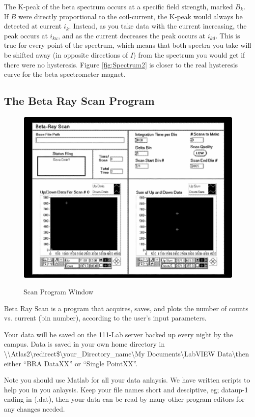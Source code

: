 \documentclass{../lab}
\begin{document}
The K-peak of the beta spectrum occurs at a specific field strength, marked $B_k$. If $B$ were directly proportional to the coil-current, the K-peak would always be detected at current $i_k$. Instead, as you take data with the current increasing, the peak occurs at $i_{ku}$, and as the current decreases the peak occurs at $i_{kd}$. This is true for every point of the spectrum, which means that both spectra you take will be shifted away (in opposite directions of $I$) from the spectrum you would get if there were no hysteresis. Figure \ref{fig:Spectrum2} is closer to the real hysteresis curve for the beta spectrometer magnet.

\pagebreak

\subsection{The Beta Ray Scan Program}

\begin{figure}[h]
    \centering
    \href{http://experimentationlab.berkeley.edu/sites/default/files/images/470px-BRAimage030.gif}{\includegraphics[width=0.5\linewidth]{images/470px-BRAimage030.png}}
    \caption{Scan Program Window}
\end{figure}

Beta Ray Scan is a program that acquires, saves, and plots the number of counts vs. current (bin number), according to the user's input parameters.

Your data will be saved on the 111-Lab server backed up every night by the campus. Data is saved in your own home directory in \textbackslash \textbackslash Atlas2\textbackslash redirect\$\textbackslash your\_Directory\_name\textbackslash My Documents\textbackslash LabVIEW Data\textbackslash then either ``BRA DataXX'' or ``Single PointXX''.

Note you should use Matlab for all your data anlaysis. We have written scripts to help you in you anlaysis. Keep your file names short and desciptive, eg; dataup-1 ending in (.dat), then your data can be read by many other program editors for any changes needed.
\end{document}
